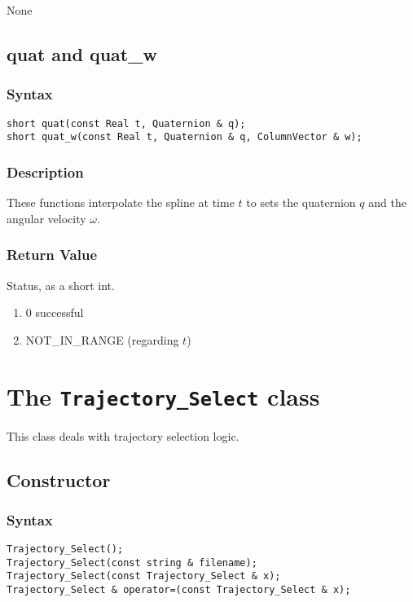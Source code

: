 \documentclass[11pt,fleqn,letterpaper]{report}
\begin{document}
None

\newpage

\subsection*{quat and quat\_w}
\subsubsection*{Syntax}
\begin{verbatim}
short quat(const Real t, Quaternion & q);
short quat_w(const Real t, Quaternion & q, ColumnVector & w);
\end{verbatim}

\subsubsection*{Description}   
These functions interpolate the spline at time $t$ to sets the
quaternion $q$ and the angular velocity $\omega$.

\subsubsection*{Return Value}

Status, as a short int.
\begin{enumerate}
\item[] 0 successful
\item[] NOT\_IN\_RANGE (regarding $t$)
\end{enumerate}

\newpage

\section{The \texttt{Trajectory\_Select} class}

This class deals with trajectory selection logic.

\subsection*{Constructor}
\subsubsection*{Syntax}
\begin{verbatim}
Trajectory_Select();
Trajectory_Select(const string & filename);
Trajectory_Select(const Trajectory_Select & x);
Trajectory_Select & operator=(const Trajectory_Select & x);
\end{verbatim}
\end{document}
